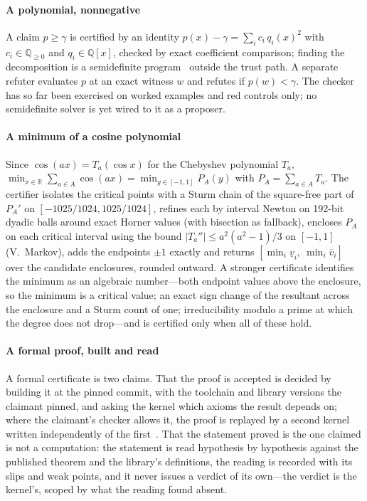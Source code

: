 \documentclass[preprint,11pt,a4paper]{elsarticle}
\theoremstyle{definition}
\newcommand{\R}{\mathbb{R}}
\newcommand{\Q}{\mathbb{Q}}
\begin{document}
\paragraph{A polynomial, nonnegative}
A claim $p\ge\gamma$ is certified by an identity $p(x)-\gamma=\sum_i c_i\,q_i(x)^2$ with $c_i\in\Q_{\ge0}$ and $q_i\in\Q[x]$, checked by exact coefficient comparison; finding the decomposition is a semidefinite program~\citep{Parrilo03,PeyrlParrilo08} outside the trust path. A separate refuter evaluates $p$ at an exact witness $w$ and refutes if $p(w)<\gamma$. The checker has so far been exercised on worked examples and red controls only; no semidefinite solver is yet wired to it as a proposer.

\paragraph{A minimum of a cosine polynomial}
Since $\cos(ax)=T_a(\cos x)$ for the Chebyshev polynomial $T_a$, $\min_{x\in\R}\sum_{a\in A}\cos(ax)=\min_{y\in[-1,1]}P_A(y)$ with $P_A=\sum_{a\in A}T_a$. The certifier isolates the critical points with a Sturm chain of the square-free part of $P_A'$ on $[-1025/1024,1025/1024]$, refines each by interval Newton on 192-bit dyadic balls around exact Horner values (with bisection as fallback), encloses $P_A$ on each critical interval using the bound $|T_a''|\le a^2(a^2-1)/3$ on $[-1,1]$ (V.~Markov), adds the endpoints $\pm1$ exactly and returns $[\min_i\underline v_i,\ \min_i\overline v_i]$ over the candidate enclosures, rounded outward. A stronger certificate identifies the minimum as an algebraic number---both endpoint values above the enclosure, so the minimum is a critical value; an exact sign change of the resultant across the enclosure and a Sturm count of one; irreducibility modulo a prime at which the degree does not drop---and is certified only when all of these hold.

\paragraph{A formal proof, built and read}
A formal certificate is two claims. That the proof is accepted is decided by building it at the pinned commit, with the toolchain and library versions the claimant pinned, and asking the kernel which axioms the result depends on; where the claimant's checker allows it, the proof is replayed by a second kernel written independently of the first~\citep{Comparator,Nanoda}. That the statement proved is the one claimed is not a computation: the statement is read hypothesis by hypothesis against the published theorem and the library's definitions, the reading is recorded with its slips and weak points, and it never issues a verdict of its own---the verdict is the kernel's, scoped by what the reading found absent.
\end{document}

